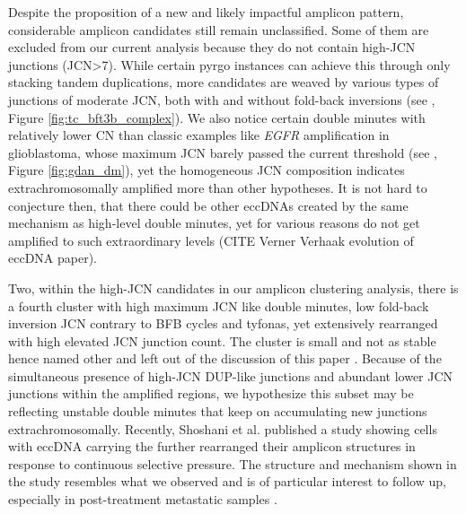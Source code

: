\documentclass[phd,tocprelim]{cornell}
\begin{document}
Despite the proposition of a new and likely impactful amplicon pattern, considerable amplicon candidates still remain unclassified. Some of them are excluded from our current analysis because they do not contain high-JCN junctions (JCN>7). While certain pyrgo instances can achieve this through only stacking tandem duplications, more candidates are weaved by various types of junctions of moderate JCN, both with and without fold-back inversions (see , Figure \ref{fig:tc_bft3b_complex}). We also notice certain double minutes with relatively lower CN than classic examples like \textit{EGFR} amplification in glioblastoma, whose maximum JCN barely passed the current threshold (see , Figure \ref{fig:gdan_dm}), yet the homogeneous JCN composition indicates extrachromosomally amplified more than other hypotheses. It is not hard to conjecture then, that there could be other eccDNAs created by the same mechanism as high-level double minutes, yet for various reasons do not get amplified to such extraordinary levels (CITE Verner Verhaak evolution of eccDNA paper).

Two, within the high-JCN candidates in our amplicon clustering analysis, there is a fourth cluster with high maximum JCN like double minutes, low fold-back inversion JCN contrary to BFB cycles and tyfonas, yet extensively rearranged with high elevated JCN junction count. The cluster is small and not as stable hence named other and left out of the discussion of this paper \cite{Hadi2020-um}. Because of the simultaneous presence of high-JCN DUP-like junctions and abundant lower JCN junctions within the amplified regions, we hypothesize this subset may be reflecting unstable double minutes that keep on accumulating new junctions extrachromosomally. Recently, Shoshani et al. published a study showing cells with eccDNA carrying the  further rearranged their amplicon structures in response to continuous selective pressure. The structure and mechanism shown in the study resembles what we observed and is of particular interest to follow up, especially in post-treatment metastatic samples \cite{Priestley:20196a6}.



\end{document}
